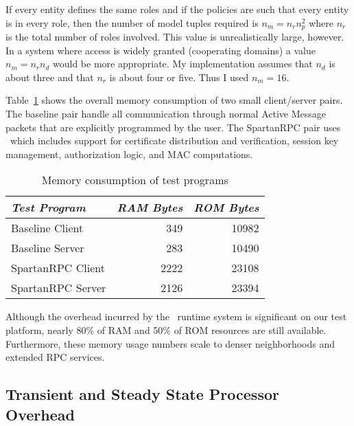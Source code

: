 If every entity defines the same roles and if the policies are such that every entity is in
every role, then the number of model tuples required is $n_m = n_r n_p^2$ where $n_r$ is the
total number of roles involved. This value is unrealistically large, however. In a system where
access is widely granted (cooperating domains) a value $n_m = n_r n_d$ would be more
appropriate. My implementation assumes that $n_d$ is about three and that $n_r$ is about four or
five. Thus I used $n_m = 16$.

Table~\ref{table-test-program-ram} shows the overall memory consumption of two small
client/server pairs. The baseline pair handle all communication through normal Active Message
packets that are explicitly programmed by the user. The SpartanRPC pair uses \Sprocket\ which
includes support for certificate distribution and verification, session key management,
authorization logic, and MAC computations.

\begin{table}[!t]
  \newcommand\T{\rule{0pt}{2.1ex}}
  \centering
  \caption{Memory consumption of test programs}
  {
  \begin{tabular}{|l|r|r|} \hline
    \textit{Test Program} \T & \textit{RAM Bytes} & \textit{ROM Bytes} \\
    \hline \hline

    Baseline Client   \T &  349 & 10982 \\ \hline 
    Baseline Server   \T &  283 & 10490 \\ \hline
    SpartanRPC Client \T & 2222 & 23108 \\ \hline
    SpartanRPC Server \T & 2126 & 23394 \\ \hline
  \end{tabular}
  }
  \label{table-test-program-ram}
\end{table}

Although the overhead incurred by the \Sprocket\ runtime system is significant on our test
platform, nearly 80\% of RAM and 50\% of ROM resources are still available. Furthermore, these
memory usage numbers scale to denser neighborhoods and extended RPC services.


\subsection{Transient and Steady State Processor Overhead} 

